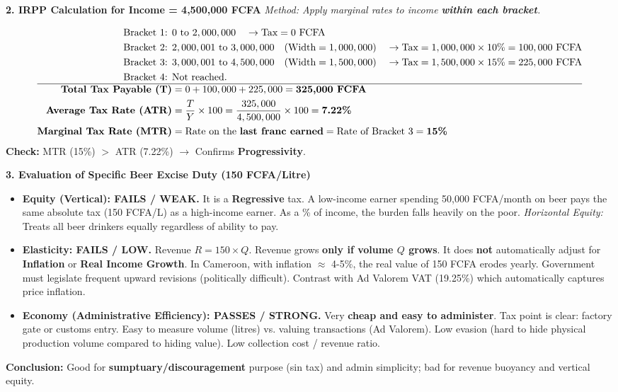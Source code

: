 \documentclass[11pt]{article}
\begin{document}
\begin{exoresolu}
\textbf{2. IRPP Calculation for Income = 4,500,000 FCFA}
\textit{Method: Apply marginal rates to income \textbf{within each bracket}.}

\begin{align*}
\text{Bracket 1: } & 0 \text{ to } 2,000,000 \quad \rightarrow \text{Tax} = 0 \text{ FCFA} \\
\text{Bracket 2: } & 2,000,001 \text{ to } 3,000,000 \quad (\text{Width} = 1,000,000) \quad \rightarrow \text{Tax} = 1,000,000 \times 10\% = 100,000 \text{ FCFA} \\
\text{Bracket 3: } & 3,000,001 \text{ to } 4,500,000 \quad (\text{Width} = 1,500,000) \quad \rightarrow \text{Tax} = 1,500,000 \times 15\% = 225,000 \text{ FCFA} \\
\text{Bracket 4: } & \text{Not reached.} \\
\hline
\textbf{Total Tax Payable (T)} & = 0 + 100,000 + 225,000 = \textbf{325,000 FCFA} \\
\textbf{Average Tax Rate (ATR)} & = \frac{T}{Y} \times 100 = \frac{325,000}{4,500,000} \times 100 = \textbf{7.22\%} \\
\textbf{Marginal Tax Rate (MTR)} & = \text{Rate on the \textbf{last franc earned}} = \text{Rate of Bracket 3} = \textbf{15\%}
\end{align*}
\textbf{Check:} MTR (15\%) $>$ ATR (7.22\%) $\rightarrow$ Confirms \textbf{Progressivity}.

\textbf{3. Evaluation of Specific Beer Excise Duty (150 FCFA/Litre)}

\begin{itemize}
    \item \textbf{Equity (Vertical): FAILS / WEAK.} It is a \textbf{Regressive} tax. A low-income earner spending 50,000 FCFA/month on beer pays the same absolute tax (150 FCFA/L) as a high-income earner. As a \% of income, the burden falls heavily on the poor. \textit{Horizontal Equity:} Treats all beer drinkers equally regardless of ability to pay.
    \item \textbf{Elasticity: FAILS / LOW.} Revenue $R = 150 \times Q$. Revenue grows \textbf{only if volume $Q$ grows}. It does \textbf{not} automatically adjust for \textbf{Inflation} or \textbf{Real Income Growth}. In Cameroon, with inflation $\approx$ 4-5\%, the real value of 150 FCFA erodes yearly. Government must legislate frequent upward revisions (politically difficult). Contrast with Ad Valorem VAT (19.25\%) which automatically captures price inflation.
    \item \textbf{Economy (Administrative Efficiency): PASSES / STRONG.} Very \textbf{cheap and easy to administer}. Tax point is clear: factory gate or customs entry. Easy to measure volume (litres) vs. valuing transactions (Ad Valorem). Low evasion (hard to hide physical production volume compared to hiding value). Low collection cost / revenue ratio.
\end{itemize}
\textbf{Conclusion:} Good for \textbf{sumptuary/discouragement} purpose (sin tax) and admin simplicity; bad for revenue buoyancy and vertical equity.
\end{exoresolu}
\end{document}
